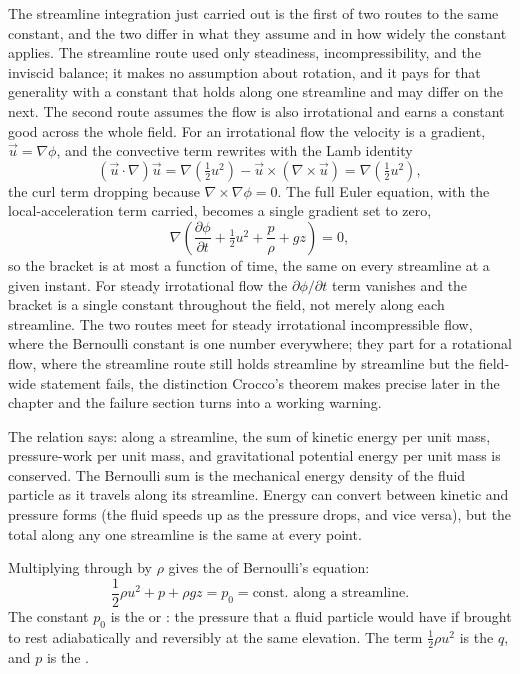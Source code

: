 The streamline integration just carried out is the first of two routes
to the same constant, and the two differ in what they assume and in how
widely the constant applies. The streamline route used only
steadiness, incompressibility, and the inviscid balance; it makes no
assumption about rotation, and it pays for that generality with a
constant that holds along one streamline and may differ on the next.
The second route assumes the flow is also irrotational and earns a
constant good across the whole field. For an irrotational flow the
velocity is a gradient, $\vec u = \nabla\phi$, and the convective term
rewrites with the Lamb identity
\[
(\vec u\cdot\nabla)\vec u
= \nabla\!\left(\tfrac12 u^2\right) - \vec u\times(\nabla\times\vec u)
= \nabla\!\left(\tfrac12 u^2\right),
\]
the curl term dropping because $\nabla\times\nabla\phi = 0$. The full
Euler equation, with the local-acceleration term carried, becomes a
single gradient set to zero,
\[
\nabla\!\left(\frac{\partial\phi}{\partial t} + \tfrac12 u^2
+ \frac{p}{\rho} + gz\right) = 0,
\]
so the bracket is at most a function of time, the same on every
streamline at a given instant. For steady irrotational flow the
$\partial\phi/\partial t$ term vanishes and the bracket is a single
constant throughout the field, not merely along each streamline. The
two routes meet for steady irrotational incompressible flow, where the
Bernoulli constant is one number everywhere; they part for a rotational
flow, where the streamline route still holds streamline by streamline
but the field-wide statement fails, the distinction Crocco's theorem
makes precise later in the chapter and the failure section turns into a
working warning.

The relation says: along a streamline, the sum of kinetic energy
per unit mass, pressure-work per unit mass, and gravitational
potential energy per unit mass is conserved. The Bernoulli sum is
the mechanical energy density of the fluid particle as it travels
along its streamline. Energy can convert between kinetic and
pressure forms (the fluid speeds up as the pressure drops, and
vice versa), but the total along any one streamline is the same at
every point.

Multiplying through by $\rho$ gives the  of
Bernoulli's equation:
\[
\frac{1}{2}\rho u^2 + p + \rho g z = p_0 = \text{const.\ along a
streamline}.
\]
The constant $p_0$ is the  or : the pressure that a fluid particle would have
if brought to rest adiabatically and reversibly at the same elevation.
The term $\tfrac{1}{2}\rho u^2$ is the 
$q$, and $p$ is the .

